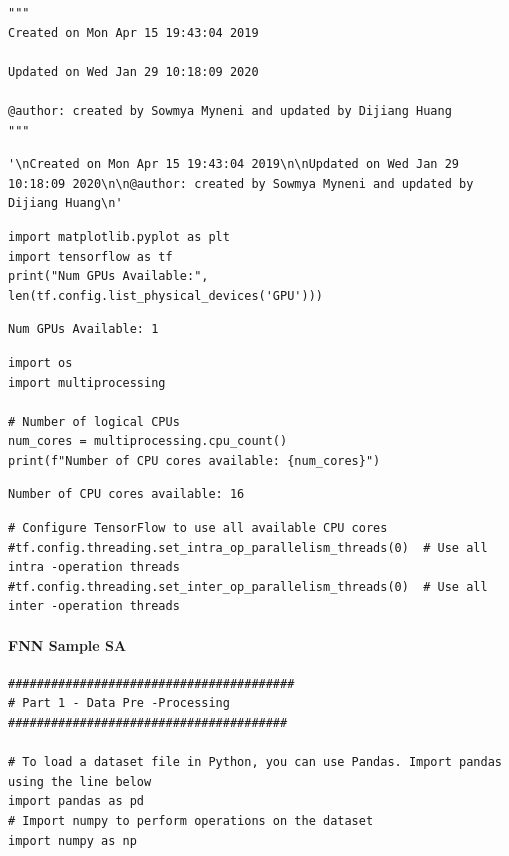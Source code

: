 \begin{verbatim}
"""
Created on Mon Apr 15 19:43:04 2019

Updated on Wed Jan 29 10:18:09 2020

@author: created by Sowmya Myneni and updated by Dijiang Huang
"""
\end{verbatim}

\begin{verbatim}
'\nCreated on Mon Apr 15 19:43:04 2019\n\nUpdated on Wed Jan 29 10:18:09 2020\n\n@author: created by Sowmya Myneni and updated by Dijiang Huang\n'
\end{verbatim}

\begin{verbatim}
import matplotlib.pyplot as plt
import tensorflow as tf
print("Num GPUs Available:", len(tf.config.list_physical_devices('GPU')))
\end{verbatim}

\begin{verbatim}
Num GPUs Available: 1
\end{verbatim}

\begin{verbatim}
import os
import multiprocessing

# Number of logical CPUs
num_cores = multiprocessing.cpu_count()
print(f"Number of CPU cores available: {num_cores}")
\end{verbatim}

\begin{verbatim}
Number of CPU cores available: 16
\end{verbatim}

\begin{verbatim}
# Configure TensorFlow to use all available CPU cores
#tf.config.threading.set_intra_op_parallelism_threads(0)  # Use all intra -operation threads
#tf.config.threading.set_inter_op_parallelism_threads(0)  # Use all inter -operation threads
\end{verbatim}

\paragraph{FNN Sample SA}

\begin{verbatim}
########################################
# Part 1 - Data Pre -Processing
#######################################

# To load a dataset file in Python, you can use Pandas. Import pandas using the line below
import pandas as pd
# Import numpy to perform operations on the dataset
import numpy as np
\end{verbatim}

